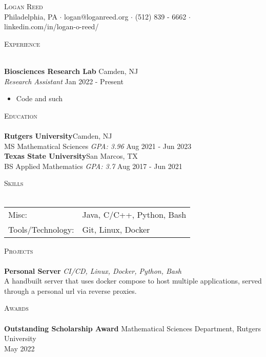 \documentclass[a4paper]{article}
\newcommand{\lineunder} {
    \vspace*{-8pt} \\
    \hspace*{-18pt} \hrulefill \\
}
\newcommand{\header} [1] {
    {\hspace*{-18pt}\vspace*{6pt} \textsc{#1}}
    \vspace*{-6pt} \lineunder
}
\begin{document}
\vspace*{-40pt}

    

\vspace*{-10pt}
\begin{center}
	{\Huge \scshape {Logan Reed}}\\
	Philadelphia, PA $\cdot$ logan@loganreed.org $\cdot$ (512) 839 - 6662 $\cdot$ linkedin.com/in/logan-o-reed/\\
\end{center}

\header{Experience}
\vspace{1mm}

\textbf{Biosciences Research Lab} \hfill Camden, NJ\\
\textit{Research Assistant} \hfill Jan 2022 - Present\\
\vspace{-1mm}
\begin{itemize} \itemsep 1pt
	\item Code and such
\end{itemize}

\header{Education}
\textbf{Rutgers University}\hfill Camden, NJ\\
MS Mathematical Sciences \textit{GPA: 3.96} \hfill Aug 2021 - Jun 2023\\
\vspace{2mm}
\textbf{Texas State University}\hfill San Marcos, TX\\
BS Applied Mathematics \textit{GPA: 3.7} \hfill Aug 2017 - Jun 2021\\
\vspace{2mm}

\header{Skills}
\begin{tabular}{ l l }
	Misc:             & Java, C/C++, Python, Bash \\
	Tools/Technology: & Git, Linux, Docker        \\
\end{tabular}
\vspace{2mm}

\header{Projects}
{\textbf{Personal Server}} {\sl CI/CD, Linux, Docker, Python, Bash} \\
A handbuilt server that uses docker compose to host multiple applications, served through a personal url via reverse proxies.\\
\vspace*{2mm}

\header{Awards}
\textbf{Outstanding Scholarship Award} \hfill Mathematical Sciences Department, Rutgers University\\
\hfill May 2022\\
\vspace*{2mm}

\ 
\end{document}
